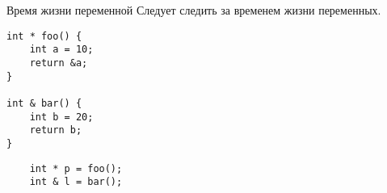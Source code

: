 \documentclass{beamer}
\begin{document}
\begin{frame}[fragile]{Время жизни переменной}
    Следует следить за временем жизни переменных.
\begin{lstlisting}
int * foo() {
    int a = 10;
    return &a;
}

int & bar() {
    int b = 20;
    return b;
}
\end{lstlisting}
\begin{lstlisting}
    int * p = foo();
    int & l = bar();
\end{lstlisting}

\end{frame}
\end{document}

